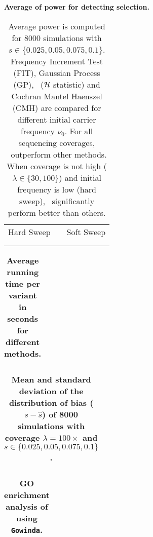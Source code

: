 
\begin{table}[H]
	\centering
		\caption{\bf Average of power for detecting selection.}
	\begin{tabular}{ccc}
		Hard Sweep & &Soft Sweep\\ \\  
		
		&&
	\end{tabular}
	\caption*{		Average power is computed  for 8000 simulations 
	with 
		$s\in\{0.025,0.05,0.075,0.1\}$. Frequency Increment 
		Test (FIT), Gaussian Process (GP), \comale\ (${\cal H}$ statistic) and 
		Cochran Mantel Haenszel (CMH) are compared for different initial 
		carrier frequency $\nu_0$. For all sequencing coverages, \comale\ 
		outperform other methods. When coverage is not high 
		($\lambda\in\{30,100\}$) and initial frequency is low (hard sweep), 
		\comale\ significantly perform better than others.}
	\label{tab:power}
\end{table}


\begin{table}[H]
	\centering
		\caption{\bf Average running time per variant in seconds for 
		different 
			methods.}
	\begin{tabular}{c}
		
	\end{tabular}
\label{tab:times}
\end{table}

\begin{table}[h]
	\centering
	\caption{\bf Mean and standard deviation of the distribution of 
	bias 
		($s-\hat{s}$) of 8000 simulations with coverage 
		$\lambda=100\times$ and 
		$s\in\{0.025,0.05,0.075,0.1\}$.}
	\begin{tabular}{c}
		
	\end{tabular}
	\label{tab:biasdist}
\end{table}

\clearpage
\newpage
\begin{table}[H]
	\centering
	\caption{\bf GO enrichment analysis of \datadm using 
		\texttt{Gowinda}.}
	\begin{tabular}{c}
		
	\end{tabular}
	\label{tab:gowinda}
\end{table}
\newpage

%		

